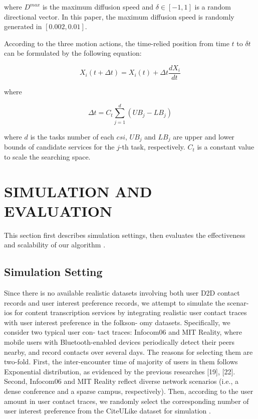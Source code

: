 \documentclass[10pt,journal,compsoc]{IEEEtran}
\begin{document}
where $D^{max}$ is the maximum diffusion speed and $\delta \in [-1, 1]$ is a random directional vector. In this paper, the maximum diffusion speed is randomly generated in $[0.002, 0.01]$. 

According to the three motion actions, the time-relied position from time $t$ to $\delta t$ can be formulated by the following equation:

\begin{equation}
X_i(t+\Delta t) = X_i(t) + \Delta t \frac{dX_i}{dt}
\end{equation}

where

\begin{equation}
\Delta t = C_t\sum_{j=1}^{d}(UB_j - LB_j)
\end{equation}

where $d$ is the tasks number of each $csi$, $UB_j$ and $LB_j$ are upper and lower bounds of candidate services for the $j$-th task, respectively. $C_t$ is a constant value to scale the searching space. 

\section{SIMULATION AND EVALUATION}

This section first describes simulation settings, then evaluates the effectiveness and scalability of our algorithm \cite{Wu2016}.

\subsection{Simulation Setting}
Since there is no available realistic datasets involving both user D2D contact records and user interest preference records, we attempt to simulate the scenar- ios for content transcription services by integrating realistic user contact traces with user interest preference in the folkson- omy datasets. Specifically, we consider two typical user con- tact traces: Infocom06 and MIT Reality, where mobile users with Bluetooth-enabled devices periodically detect their peers nearby, and record contacts over several days. The reasons for selecting them are two-fold. First, the inter-encounter time of majority of users in them follows Exponential distribution, as evidenced by the previous researches [19], [22]. Second, Infocom06 and MIT Reality reflect diverse network scenarios (i.e., a dense conference and a sparse campus, respectively). Then, according to the user amount in user contact traces, we randomly select the corresponding number of user interest preference from the CiteULike dataset for simulation \cite{Pu2017}.
\end{document}
